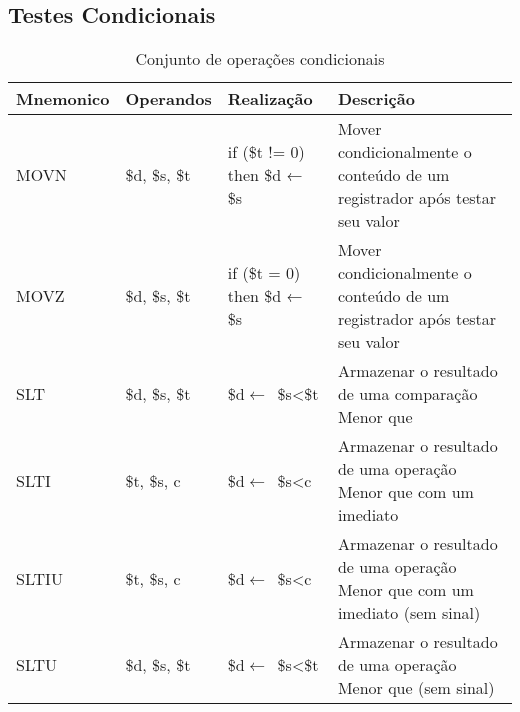 \documentclass{report}
\begin{document}
  \subsection{Testes Condicionais}
  \FloatBarrier
    \begin{table}[H]
      \begin{center}
        \begin{tabular}[pos]{|m{3cm}|m{2.8cm}|m{3cm}|m{4cm}|} 
          \hline
          \cellcolor[gray]{0.9}\textbf{Mnemonico} & \cellcolor[gray]{0.9}\textbf{Operandos} & \cellcolor[gray]{0.9}\textbf{Realização} & \cellcolor[gray]{0.9}\textbf{Descrição} \\ \hline
              MOVN  &  \$d, \$s, \$t & if (\$t != 0) then \$d ← \$s &  Mover condicionalmente o conteúdo de um registrador após testar seu valor\\ \hline 
              MOVZ  &  \$d, \$s, \$t & if (\$t = 0) then \$d ← \$s &  Mover condicionalmente o conteúdo de um registrador após testar seu valor\\ \hline
              SLT  & \$d, \$s, \$t & \$d$\leftarrow$\ \$s<\$t &  Armazenar o resultado de uma comparação Menor que \\ \hline
              SLTI  &  \$t, \$s, c & \$d$\leftarrow$\ \$s<c &  Armazenar o resultado de uma operação Menor que com um imediato\\ \hline
              SLTIU  &  \$t, \$s, c & \$d$\leftarrow$\ \$s<c &  Armazenar o resultado de uma operação Menor que com um imediato (sem sinal)\\ \hline 
              SLTU  &  \$d, \$s, \$t & \$d$\leftarrow$\ \$s<\$t &  Armazenar o resultado de uma operação Menor que (sem sinal)\\ \hline 
              
        \end{tabular}
        \caption{Conjunto de operações condicionais}
		\label{table:conjOpCon}
      \end{center}
    \end{table}
  
\end{document}

